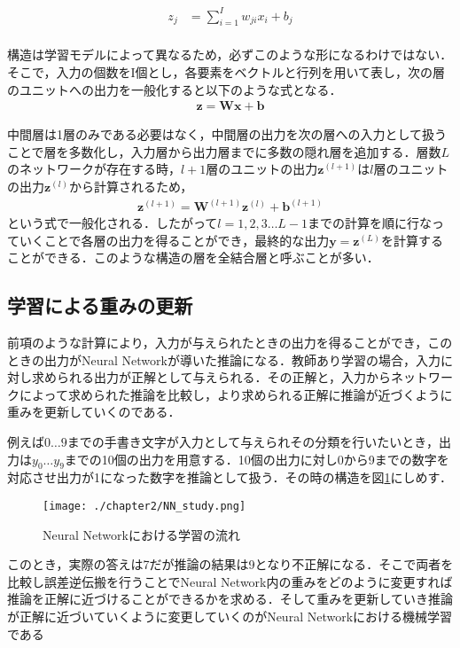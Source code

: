 \begin{align}
z_{j} &= \sum^{I}_{i=1}w_{ji}x_{i} + b_j\\
\end{align}

構造は学習モデルによって異なるため，必ずこのような形になるわけではない．そこで，入力の個数をI個とし，各要素をベクトルと行列を用いて表し，次の層のユニットへの出力を一般化すると以下のような式となる．
\begin{align}
\bm{z} = \bm{W}\bm{x} + \bm{b}
\end{align}

中間層は1層のみである必要はなく，中間層の出力を次の層への入力として扱うことで層を多数化し，入力層から出力層までに多数の隠れ層を追加する．層数$L$のネットワークが存在する時，$l+1$層のユニットの出力$\bm{z}^{(l+1)}$は$l$層のユニットの出力$\bm{z}^{(l)}$から計算されるため，
\begin{align}
\bm{z}^{(l+1)} = \bm{W}^{(l+1)}\bm{z}^{(l)} + \bm{b}^{(l+1)}
\end{align}
という式で一般化される．したがって$l=1,2,3\ldots L-1$までの計算を順に行なっていくことで各層の出力を得ることができ，最終的な出力$\bm{y}=\bm{z}^{(L)}$を計算することができる．このような構造の層を全結合層と呼ぶことが多い．


\subsection{学習による重みの更新}
前項のような計算により，入力が与えられたときの出力を得ることができ，このときの出力がNeural Networkが導いた推論になる．教師あり学習の場合，入力に対し求められる出力が正解として与えられる．その正解と，入力からネットワークによって求められた推論を比較し，より求められる正解に推論が近づくように重みを更新していくのである．

例えば$0 \ldots 9$までの手書き文字が入力として与えられその分類を行いたいとき，出力は$y_0 \ldots y_9$までの10個の出力を用意する．10個の出力に対し0から9までの数字を対応させ出力が1になった数字を推論として扱う．その時の構造を図\ref{fig_study}にしめす．
\begin{figure}[]
  \begin{center}
    \texttt{[image: ./chapter2/NN\_study.png]}
    \caption{Neural Networkにおける学習の流れ}
    \label{fig_study}
  \end{center}
\end{figure}

このとき，実際の答えは7だが推論の結果は9となり不正解になる．そこで両者を比較し誤差逆伝搬を行うことでNeural Network内の重みをどのように変更すれば推論を正解に近づけることができるかを求める．そして重みを更新していき推論が正解に近づいていくように変更していくのがNeural Networkにおける機械学習である

